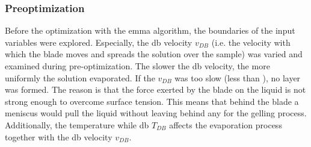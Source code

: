 \subsubsection{Preoptimization}
Before the optimization with the \gls{emma} algorithm, 
the boundaries of the input variables were explored. 
Especially, the \gls{db} velocity $v_{DB}$ (i.e. the velocity with which the blade moves and spreads the solution over the sample)
was varied and examined during pre-optimization. 
The slower the \gls{db} velocity, the more uniformly the solution evaporated. 
If the $v_{DB}$ was too slow (less than ), no layer was formed. 
The reason is that the force exerted by the blade on the liquid is not strong enough to overcome surface tension. 
This means that behind the blade a meniscus would pull the liquid without leaving behind any for the gelling process. 
Additionally, the temperature while \gls{db} $T_{DB}$ affects the evaporation process together with the \gls{db} velocity $v_{DB}$. 




